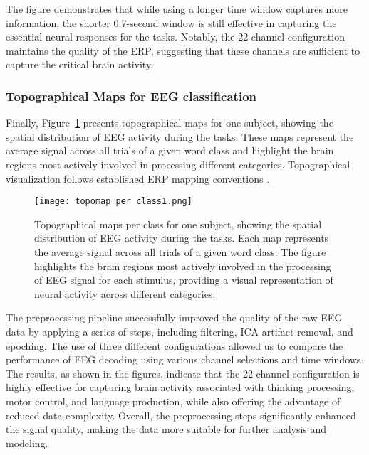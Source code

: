 \documentclass[pdflatex,sn-mathphys-num]{sn-jnl}%
\theoremstyle{thmstyleone}%
\theoremstyle{thmstyletwo}%
\theoremstyle{thmstylethree}%
\begin{document}
The figure demonstrates that while using a longer time window captures more information, the shorter 0.7-second window is still effective in capturing the essential neural responses for the tasks. Notably, the 22-channel configuration maintains the quality of the ERP, suggesting that these channels are sufficient to capture the critical brain activity.

\subsubsection{Topographical Maps for EEG classification }\label{subsec10}

Finally, Figure~\ref{fig:topomap per class} presents topographical maps for one subject, showing the spatial distribution of EEG activity during the tasks. These maps represent the average signal across all trials of a given word class and highlight the brain regions most actively involved in processing different categories. Topographical visualization follows established ERP mapping conventions \cite{Kappenman2021,Luck2014}.

\begin{figure}[H]
    \centering
    \texttt{[image: topomap per class1.png]}
    \caption{Topographical maps per class for one subject, showing the spatial distribution of EEG activity during the tasks. Each map represents the average signal across all trials of a given word class. The figure highlights the brain regions most actively involved in the processing of EEG signal for each stimulus, providing a visual representation of neural activity across different categories.}
    \label{fig:topomap per class}
\end{figure}

The preprocessing pipeline successfully improved the quality of the raw EEG data by applying a series of steps, including filtering, ICA artifact removal, and epoching. The use of three different configurations allowed us to compare the performance of EEG decoding using various channel selections and time windows. The results, as shown in the figures, indicate that the 22-channel configuration is highly effective for capturing brain activity associated with thinking processing, motor control, and language production, while also offering the advantage of reduced data complexity. Overall, the preprocessing steps significantly enhanced the signal quality, making the data more suitable for further analysis and modeling.
\end{document}
